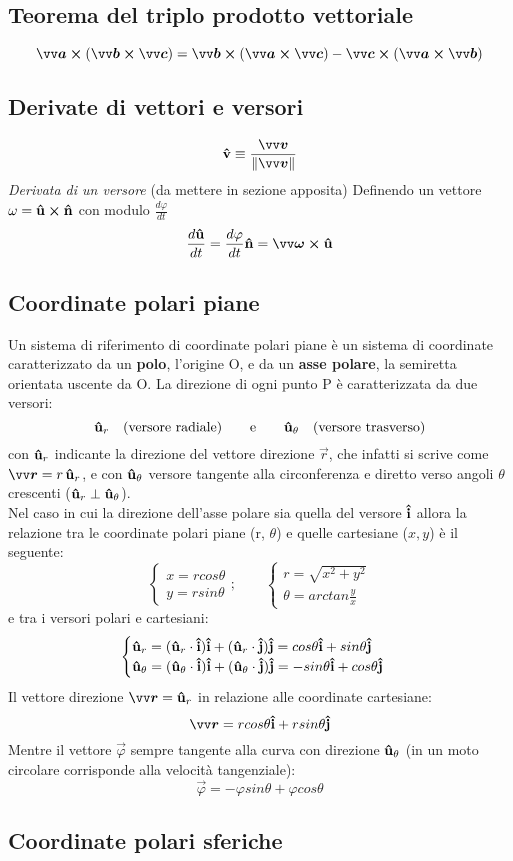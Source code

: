\subsection*{Teorema del triplo prodotto vettoriale}
\[
 \vec{a} \cross (\vec{b} \cross \vec{c}) = \vec{b} \cross (\vec{a} \cross \vec{c}) -
 \vec{c} \cross (\vec{a} \cross \vec{b})
\]
\subsection*{Derivate di vettori e versori }
\[
     \v{v} \equiv \frac{\vec{v}}{\Norm{v}}
\]
\emph{Derivata di un versore} (da mettere in sezione apposita)
Definendo un vettore $\omega = \mathbf{\hat{u}} \cross \mathbf{\hat{n}}$ con modulo $\frac{d \varphi}{dt}$
\[
 \frac{d\v{u}}{dt} = \frac{d \varphi}{dt} \v{n} = \vec{\omega} \cross \v{u}     
\]

\subsection*{Coordinate polari piane}
Un sistema di riferimento di coordinate polari piane è un sistema di coordinate 
caratterizzato da un \textbf{polo}, l'origine O, e da un \textbf{asse polare},
la semiretta orientata uscente da O. La direzione di ogni punto P è caratterizzata
da due versori:
\[
 \mathbf{\hat{u}}_r \quad (\text{versore radiale}) \qquad \text{e} \qquad \mathbf{\hat{u}}_{\theta}
 \quad  \text{(versore trasverso)}     
\]
con $\mathbf{\hat{u}}_r$ indicante la direzione del vettore direzione $\vec{r}$, che infatti si 
scrive come $\vec{r} = r \, \v{u}_r$, e con $\mathbf{\hat{u}}_{\theta}$ versore tangente alla 
circonferenza e diretto verso angoli $\theta$ crescenti ($\mathbf{\hat{u}}_r \perp \mathbf{\hat{u}}_{\theta}$).\\
Nel caso in cui la direzione dell'asse polare
sia quella del versore $\mathbf{\hat{i}}$ allora la relazione tra le coordinate polari piane (r, $\theta$)
e quelle cartesiane ($x,y$) è il seguente:
\[
\begin{cases}
     x = r cos \theta \\
     y = r sin \theta
\end{cases}
; \qquad
\begin{cases}
     r = \sqrt{x^2 + y^2} \\
     \theta = arctan \frac{y}{x}
\end{cases}     
\]
e tra i versori polari e cartesiani:
\[
\begin{cases}
     \mathbf{\hat{u}}_r = (\mathbf{\hat{u}}_r \cdot \mathbf{\hat{i}})\mathbf{\hat{i}} + (\mathbf{\hat{u}}_r \cdot \mathbf{\hat{j}})\mathbf{\hat{j}} =
     cos \theta\mathbf{\hat{i}} + sin \theta \mathbf{\hat{j}} \\
     \mathbf{\hat{u}}_{\theta}= (\mathbf{\hat{u}}_{\theta} \cdot \mathbf{\hat{i}})\mathbf{\hat{i}} + (\mathbf{\hat{u}}_{\theta} \cdot \mathbf{\hat{j}})\mathbf{\hat{j}} =
     -sin \theta \mathbf{\hat{i}} + cos \theta \mathbf{\hat{j}}
\end{cases}     
\]
Il vettore direzione $\vec{r} = \v{u}_r$ in relazione alle coordinate cartesiane:
\[
     \vec{r} = r cos \theta \v{i} + r sin \theta \v{j}     
\]
Mentre il vettore $\vec{\varphi}$ sempre tangente alla curva con direzione $\mathbf{\hat{u}}_{\theta}$
(in un moto circolare corrisponde alla velocità tangenziale): 
\[
    \vec{\varphi} = - \varphi sin \theta + \varphi cos \theta     
\]
\subsection*{Coordinate polari sferiche}
